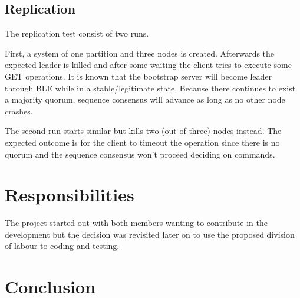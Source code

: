 \documentclass[a4paper]{scrartcl}
\begin{document}
\subsection{Replication}
The replication test consist of two runs.

First, a system of one partition and three nodes is created. 
Afterwards the expected leader is killed and after some waiting the client tries to execute some GET operations.
It is known that the bootstrap server will become leader through BLE while in a stable/legitimate state.
Because there continues to exist a majority quorum, sequence consensus will advance as long as no other node crashes.

The second run starts similar but kills two (out of three) nodes instead.
The expected outcome is for the client to timeout the operation since there is no quorum and the sequence consensus won't proceed deciding on commands.

\section{Responsibilities}
The project started out with both members wanting to contribute in  the development but the decision was revisited later on to use the proposed division of labour to coding and testing.


\section{Conclusion}
\end{document}
